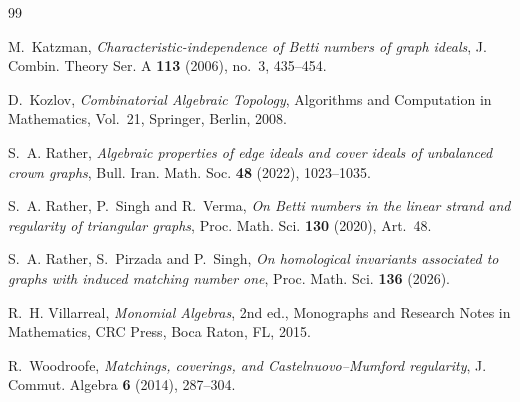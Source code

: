 \documentclass[12pt,reqno]{amsart}
\theoremstyle{definition}
\numberwithin{equation}{section}
\begin{document}
\begin{thebibliography}{99}
	
	M.~Katzman,
	\emph{Characteristic-independence of Betti numbers of graph ideals},
	J. Combin. Theory Ser. A \textbf{113} (2006), no.~3, 435--454.
	
	D.~Kozlov,
	\emph{Combinatorial Algebraic Topology},
	Algorithms and Computation in Mathematics, Vol.~21,
	Springer, Berlin, 2008.
	
	S.~A. Rather,
	\emph{Algebraic properties of edge ideals and cover ideals of unbalanced
		crown graphs},
	Bull. Iran. Math. Soc. \textbf{48} (2022), 1023--1035.
	
	S.~A. Rather, P.~Singh and R.~Verma,
	\emph{On Betti numbers in the linear strand and regularity of triangular
		graphs},
	Proc. Math. Sci. \textbf{130} (2020), Art.~48.
	
	S.~A. Rather, S.~Pirzada and P.~Singh,
	\emph{On homological invariants associated to graphs with induced matching number one},
	Proc. Math. Sci. \textbf{136} (2026).
	
	R.~H. Villarreal,
	\emph{Monomial Algebras},
	2nd ed., Monographs and Research Notes in Mathematics,
	CRC Press, Boca Raton, FL, 2015.
	
	R.~Woodroofe,
	\emph{Matchings, coverings, and Castelnuovo--Mumford regularity},
	J. Commut. Algebra \textbf{6} (2014), 287--304.
	
\end{thebibliography}
\end{document}
